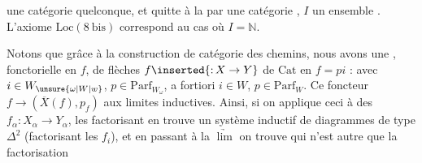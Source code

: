 une  catégorie  quelconque, et quitte à la  par une catégorie ,  $I$ un ensemble . L'axiome $\mathrm{Loc}(8\ \mathrm{bis})$ correspond au cas où $I=\mathbb{N}$.

Notons que grâce à la construction de   catégorie des chemins, nous avons une  , fonctorielle en $f$, de  flèches $f\inserted{{:}\,X\to Y}$ de $\mathrm{Cat}$ en $f=pi$ :
avec $i\in W_{\unsure{\omega|W|w}}$, $p\in\mathrm{Parf}_{W_\omega}$, a fortiori $i\in W$, $p\in\mathrm{Parf}_W$. Ce foncteur $f\longrightarrow(\overline X(f),p_f)$  aux limites inductives.
Ainsi, si on applique ceci à  des $f_\alpha:X_\alpha\longrightarrow Y_\alpha$, les factorisant en
  trouve un système inductif de diagrammes de type $\Delta^2$ (factorisant les $f_i$), et en passant à la $\underrightarrow{\lim}$ on trouve
qui n'est autre que la factorisation 
